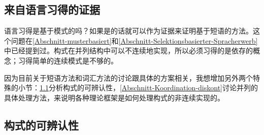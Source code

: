 \begin{exe}
\begin{xlist}[iv.]
\begin{exe}
\begin{xlist}[iv.]
\section{来自语言习得的证据} 
\label{sec-acquisition}

语言习得是基于模式的吗？如果是的话就可以作为证据来证明基于短语的方法。这个问题在\ref{Abschnitt-musterbasiert}和\ref{Abschnitt-Selektionsbasierter-Spracherwerb}中已经提到过。构式在并列结构中可以不连续地实现，所以必须习得的是依存的概念；习得简单的连续模式是不够的。

因为目前关于短语方法和词汇方法的讨论跟具体的方案相关，我想增加另外两个特殊的小节：\ref{sec-recognizability-of-constructions}分析构式的可辨认性，\ref{Abschnitt-Koordination-diskont}讨论并列的具体处理方法，来说明各种理论框架是如何处理构式的非连续实现的。

\subsection{构式的可辨认性}
\label{sec-recognizability-of-constructions}
 

\end{xlist}
\end{exe}
\end{xlist}
\end{exe}
